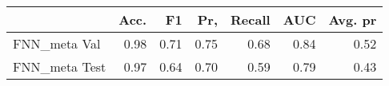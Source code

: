 \begin{tabular}{lrrrrrr}
\toprule
{} &  Acc. &    F1 &   Pr, &  Recall &   AUC &  Avg. pr \\
\midrule
FNN\_meta Val  &  0.98 &  0.71 &  0.75 &    0.68 &  0.84 &     0.52 \\
FNN\_meta Test &  0.97 &  0.64 &  0.70 &    0.59 &  0.79 &     0.43 \\
\bottomrule
\end{tabular}
